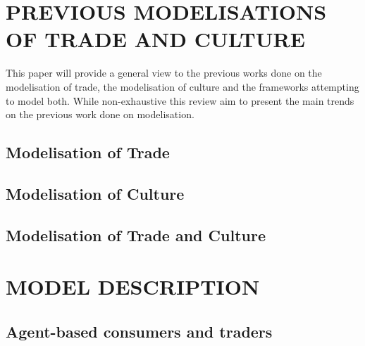 \documentclass{wscpaperproc}
\begin{document}
\section{PREVIOUS MODELISATIONS OF TRADE AND CULTURE}

This paper will provide a general view to the previous works done on the modelisation of trade, the modelisation of culture and the frameworks attempting to model both. While non-exhaustive this review aim to present the main trends on the previous work done on modelisation.

\subsection{Modelisation of Trade}


\subsection{Modelisation of Culture}

\subsection{Modelisation of Trade and Culture}


\section{MODEL DESCRIPTION}

\subsection{Agent-based consumers and traders}
\end{document}
